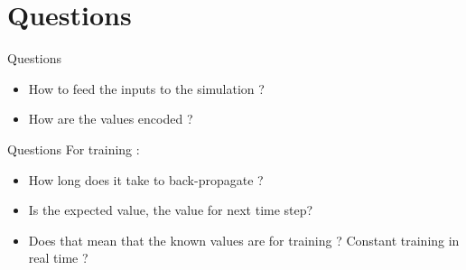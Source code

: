 \documentclass{beamer}
\begin{document}

\section{Questions}
\begin{frame}{Questions}
    \begin{itemize}
         \item How to feed the inputs to the simulation ?
         \item How are the values encoded ?
    \end{itemize}
\end{frame}

\begin{frame}{Questions}
    For training :
    \begin{itemize}
        \item How long does it take to back-propagate ?
        \item Is the expected value, the value for next time step?
        \item Does that mean that the known values are for training ? Constant training in real time ?
    \end{itemize}
\end{frame}
\end{document}
